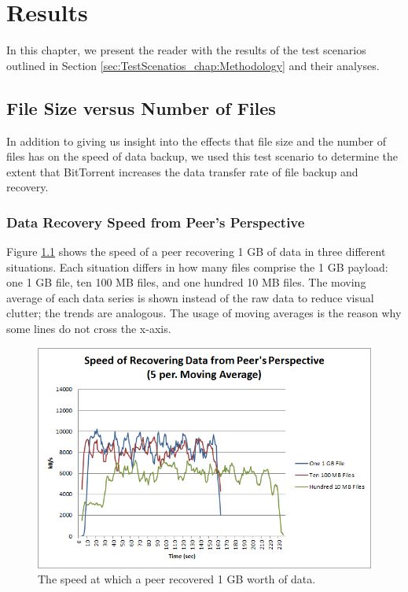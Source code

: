 \documentclass[12pt]{report}
\begin{document}
\chapter{Results} \label{chap:Results}

In this chapter, we present the reader with the results of the test scenarios outlined in Section \ref{sec:TestScenatios_chap:Methodology} and their analyses.

\section{File Size versus Number of Files} \label{sec:FileSizeversusNumberofFiles_chap:Results}

In addition to giving us insight into the effects that file size and the number of files has on the speed of data backup, we used this test scenario to determine the extent that BitTorrent increases the data transfer rate of file backup and recovery.

\subsection{Data Recovery Speed from Peer's Perspective} \label{subsec:DataRecoverySpeedfromPeersPerspective}

Figure \ref{fig:PeerRecoverySpeed} shows the speed of a peer recovering 1 GB of data in three different situations. Each situation differs in how many files comprise the 1 GB payload: one 1 GB file, ten 100 MB files, and one hundred 10 MB files. The moving average of each data series is shown instead of the raw data to reduce visual clutter; the trends are analogous. The usage of moving averages is the reason why some lines do not cross the x-axis.

\begin{figure}
  \centerline{\includegraphics[scale=1]{figures/PeerRecoverySpeed}}
  \caption{The speed at which a peer recovered 1 GB worth of data. \label{fig:PeerRecoverySpeed}}
\end{figure}
\end{document}

